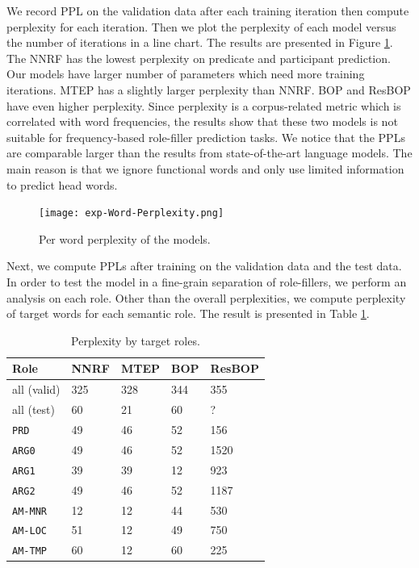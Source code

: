 \documentclass[a4paper]{article}
\begin{document}
We record PPL on the validation data after each training iteration then compute perplexity for each iteration. Then we plot the perplexity of each model versus the number of iterations in a line chart. The results are presented in Figure \ref{fig:exp-Word-Perplexity}. The NNRF has the lowest perplexity on predicate and participant prediction. Our models have larger number of parameters which need more training iterations. MTEP has a slightly larger perplexity than NNRF. BOP and ResBOP have even higher perplexity. Since perplexity is a corpus-related metric which is correlated with word frequencies, the results show that these two models is not suitable for frequency-based role-filler prediction tasks. We notice that the PPLs are comparable larger than the results from state-of-the-art language models. The main reason is that we ignore functional words and only use limited information to predict head words. 

\begin{figure}[p]
\centering
\texttt{[image: exp-Word-Perplexity.png]}
\caption{\label{fig:exp-Word-Perplexity} Per word perplexity of the models.}
\end{figure}

Next, we compute PPLs after training on the validation data and the test data. In order to test the model in a fine-grain separation of role-fillers, we perform an analysis on each role. Other than the overall perplexities, we compute perplexity of target words for each semantic role. The result is presented in Table \ref{tab:eval-perplexity-role}. 

\begin{table}[t]
\centering
\begin{tabular}{l||llll}
\textbf{Role}   &   NNRF   &   MTEP    &   BOP      &   ResBOP         \\ \hline
all (valid)     &   325&    328   &   344  &   355      \\  \hline
all (test)      &   60 &   21      &   60  &   ?       \\
\texttt{PRD}    &   49 &   46      &   52  &   156     \\
\texttt{ARG0}   &   49 &   46      &   52  &   1520    \\
\texttt{ARG1}   &   39 &   39      &   12  &   923     \\
\texttt{ARG2}   &   49 &   46      &   52  &   1187    \\
\texttt{AM-MNR} &   12 &   12      &   44  &   530     \\
\texttt{AM-LOC} &   51 &   12      &   49  &   750     \\
\texttt{AM-TMP} &   60 &   12      &   60  &   225     \\
\end{tabular}
\caption{\label{tab:eval-perplexity-role} Perplexity by target roles.}
\end{table}
\end{document}
